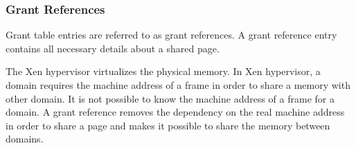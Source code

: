 \subsubsection*{Grant References}
Grant table entries are referred to as grant references. A grant reference entry contains all necessary details about a shared page. 

The Xen hypervisor virtualizes the physical memory. In Xen hypervisor, a domain requires the machine address of a frame in order to share a memory with other domain. It is not possible to know the machine address of a frame for a domain. A grant reference removes the dependency on the real machine address in order to share a page and makes it possible to share the memory between domains.\cite{Chisnall:2007:DGX:1407351, barham2003xen, granttable} 

